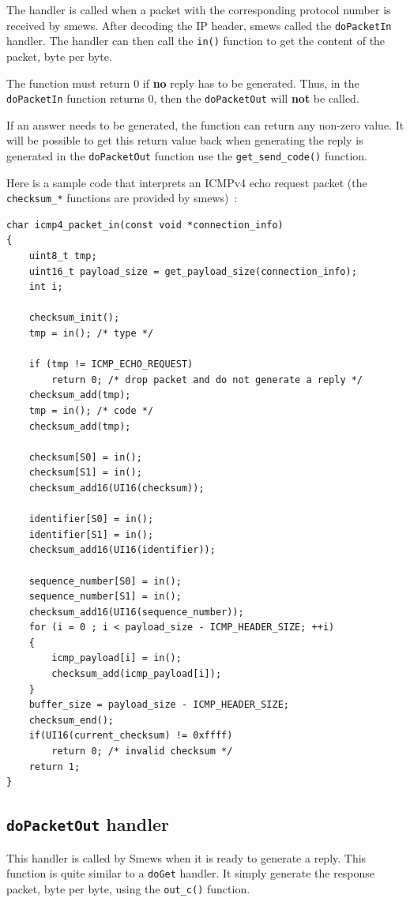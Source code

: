 \documentclass{report}
\begin{document}
The handler is called when a packet with the corresponding protocol number is
received by smews. After decoding the IP header, smews called the
\texttt{doPacketIn} handler. The handler can then call the \verb!in()! function
to get the content of the packet, byte per byte.

The function must return 0 if \textbf{no} reply has to be generated. Thus, in
the \texttt{doPacketIn} function returns 0, then the \texttt{doPacketOut} will
\textbf{not} be called.

If an answer needs to be generated, the function can return any non-zero
value. It will be possible to get this return value back when generating the
reply is generated in the \texttt{doPacketOut} function use the
\verb!get_send_code()! function.

Here is a sample code that interprets an ICMPv4 echo request packet (the
\verb!checksum_*! functions are provided by smews)~:

\begin{lstlisting}
char icmp4_packet_in(const void *connection_info)
{
	uint8_t tmp;
	uint16_t payload_size = get_payload_size(connection_info);
	int i;

	checksum_init();
	tmp = in(); /* type */

	if (tmp != ICMP_ECHO_REQUEST)
		return 0; /* drop packet and do not generate a reply */
	checksum_add(tmp);
	tmp = in(); /* code */
	checksum_add(tmp);

	checksum[S0] = in();
	checksum[S1] = in();
	checksum_add16(UI16(checksum));

	identifier[S0] = in();
	identifier[S1] = in();
	checksum_add16(UI16(identifier));

	sequence_number[S0] = in();
	sequence_number[S1] = in();
	checksum_add16(UI16(sequence_number));
	for (i = 0 ; i < payload_size - ICMP_HEADER_SIZE; ++i)
	{
		icmp_payload[i] = in();
		checksum_add(icmp_payload[i]);
	}
	buffer_size = payload_size - ICMP_HEADER_SIZE;
	checksum_end();
	if(UI16(current_checksum) != 0xffff)
		return 0; /* invalid checksum */
	return 1;
}
\end{lstlisting}


\subsection{\texttt{doPacketOut} handler}
\label{sec:dopacketout}

This handler is called by Smews when it is ready to generate a reply. This
function is quite similar to a \texttt{doGet} handler. It simply generate the
response packet, byte per byte, using the \verb!out_c()! function. 
\end{document}
